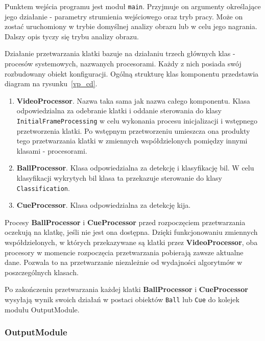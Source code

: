 \documentclass[12pt]{article}
\begin{document}
Punktem wejścia programu jest moduł \lstinline{main}. Przyjmuje on argumenty określające jego działanie - parametry strumienia wejściowego oraz tryb pracy. Może on zostać uruchomiony w trybie domyślnej analizy obrazu lub w celu jego nagrania. Dalszy opis tyczy się trybu analizy obrazu.

Działanie przetwarzania klatki bazuje na działaniu trzech głównych klas - procesów systemowych, nazwanych procesorami. Każdy z nich posiada swój rozbudowany obiekt konfiguracji. Ogólną strukturę klas komponentu przedstawia diagram na rysunku~\ref{vp_cd}.

\begin{enumerate}
    \item \textbf{VideoProcessor}. Nazwa taka sama jak nazwa całego komponentu. Klasa odpowiedzialna za odebranie klatki i oddanie sterowania do klasy \lstinline{InitialFrameProcessing} w celu wykonania procesu inicjalizacji i wstępnego przetworzenia klatki. Po wstępnym przetworzeniu umieszcza ona produkty tego przetwarzania klatki w zmiennych współdzielonych pomiędzy innymi klasami - procesorami.
    \item \textbf{BallProcessor}. Klasa odpowiedzialna za detekcję i klasyfikację bil. W celu klasyfikacji wykrytych bil klasa ta przekazuje sterowanie do klasy \lstinline{Classification}.
    \item \textbf{CueProcessor}. Klasa odpowiedzialna za detekcję kija. %
\end{enumerate}

Procesy \textbf{BallProcessor} i \textbf{CueProcessor} przed rozpoczęciem przetwarzania oczekują na klatkę, jeśli nie jest ona dostępna. Dzięki funkcjonowaniu zmiennych współdzielonych, w których przekazywane są klatki przez \textbf{VideoProcessor}, oba procesory w momencie rozpoczęcia przetwarzania pobierają zawsze aktualne dane. Pozwala to na przetwarzanie niezależnie od wydajności algorytmów w poszczególnych klasach.

Po zakończeniu przetwarzania każdej klatki \textbf{BallProcessor} i \textbf{CueProcessor} wysyłają wynik swoich działań w postaci obiektów \lstinline{Ball} lub \lstinline{Cue} do kolejek modułu OutputModule.



\subsubsection{OutputModule}
\end{document}
